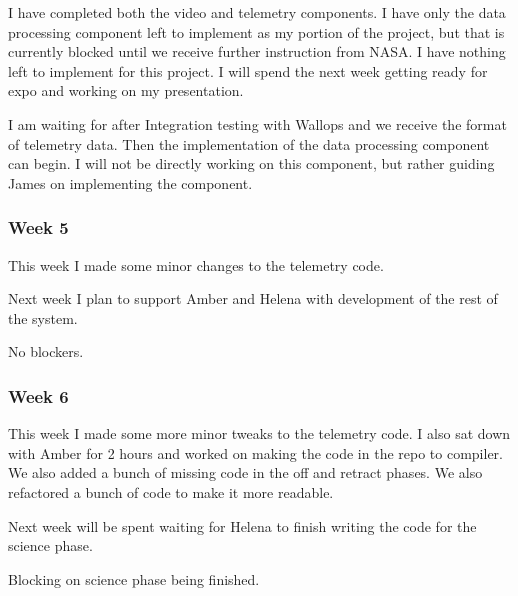 I have completed both the video and telemetry components. I have only the data processing component left to implement as my portion of the project, but that is currently blocked until we receive further instruction from NASA. I have nothing left to implement for this project. I will spend the next week getting ready for expo and working on my presentation.

I am waiting for after Integration testing with Wallops and we receive the format of telemetry data. Then the implementation of the data processing component can begin. I will not be directly working on this component, but rather guiding James on implementing the component.

\subsubsection{Week 5}
This week I made some minor changes to the telemetry code.

Next week I plan to support Amber and Helena with development of the rest of the system.

No blockers.

\subsubsection{Week 6}
This week I made some more minor tweaks to the telemetry code. I also sat down with Amber for 2 hours and worked on making the code in the repo to compiler. We also added a bunch of missing code in the off and retract phases. We also refactored a bunch of code to make it more readable.

Next week will be spent waiting for Helena to finish writing the code for the science phase.

Blocking on science phase being finished.
